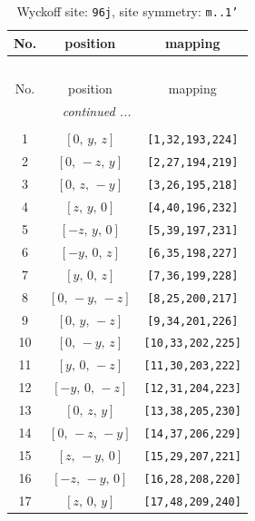 \documentclass[fleqn,8pt]{jsarticle}
\begin{document}
\begin{longtable}{ccc}
\caption{Wyckoff site: {\tt 96j}, site symmetry: {\tt m..1'}}
 \\
 \hline \hline
No. & position & mapping \\ \hline \endfirsthead

\multicolumn{2}{l}{\tablename\ \thetable{}} \\
 \hline \hline
No. & position & mapping \\ \hline \endhead

 \hline \hline
\multicolumn{2}{r}{\footnotesize\it continued ...} \\ \endfoot

 \hline \hline
\multicolumn{2}{r}{} \\ \endlastfoot

1 & $\left[ 0,\, y,\, z \right]$ & {\tt [1,32,193,224]} \\ \hline
2 & $\left[ 0,\, - z,\, y \right]$ & {\tt [2,27,194,219]} \\ \hline
3 & $\left[ 0,\, z,\, - y \right]$ & {\tt [3,26,195,218]} \\ \hline
4 & $\left[ z,\, y,\, 0 \right]$ & {\tt [4,40,196,232]} \\ \hline
5 & $\left[ - z,\, y,\, 0 \right]$ & {\tt [5,39,197,231]} \\ \hline
6 & $\left[ - y,\, 0,\, z \right]$ & {\tt [6,35,198,227]} \\ \hline
7 & $\left[ y,\, 0,\, z \right]$ & {\tt [7,36,199,228]} \\ \hline
8 & $\left[ 0,\, - y,\, - z \right]$ & {\tt [8,25,200,217]} \\ \hline
9 & $\left[ 0,\, y,\, - z \right]$ & {\tt [9,34,201,226]} \\ \hline
10 & $\left[ 0,\, - y,\, z \right]$ & {\tt [10,33,202,225]} \\ \hline
11 & $\left[ y,\, 0,\, - z \right]$ & {\tt [11,30,203,222]} \\ \hline
12 & $\left[ - y,\, 0,\, - z \right]$ & {\tt [12,31,204,223]} \\ \hline
13 & $\left[ 0,\, z,\, y \right]$ & {\tt [13,38,205,230]} \\ \hline
14 & $\left[ 0,\, - z,\, - y \right]$ & {\tt [14,37,206,229]} \\ \hline
15 & $\left[ z,\, - y,\, 0 \right]$ & {\tt [15,29,207,221]} \\ \hline
16 & $\left[ - z,\, - y,\, 0 \right]$ & {\tt [16,28,208,220]} \\ \hline
17 & $\left[ z,\, 0,\, y \right]$ & {\tt [17,48,209,240]} \\ \hline

\end{longtable}
\end{document}
